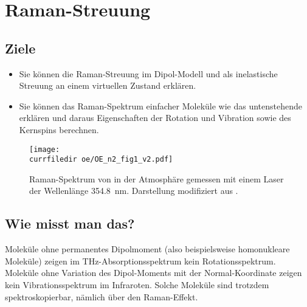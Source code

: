 
\chapter{Raman-Streuung}



% 


\section{Ziele}

\begin{itemize}
\item Sie können die Raman-Streuung im Dipol-Modell und als inelastische Streuung an einem virtuellen Zustand erklären.

\item Sie können das Raman-Spektrum einfacher Moleküle wie das untenstehende erklären und daraus Eigenschaften der Rotation und Vibration sowie des Kernspins berechnen.

\end{itemize}

\begin{figure}
\texttt{[image: \\currfiledir oe/OE\_n2\_fig1\_v2.pdf]}
\caption{Raman-Spektrum von  in der Atmosphäre gemessen mit einem Laser der Wellenlänge 354.8~nm. Darstellung  modifiziert aus \cite{Liu14_OE_N2}. }
\end{figure}


\section{Wie misst man das?}

Moleküle ohne permanentes Dipolmoment (also beispielsweise homonukleare Moleküle) zeigen im THz-Absorptionsspektrum kein Rotationsspektrum. Moleküle ohne  Variation des Dipol-Moments mit der Normal-Koordinate zeigen kein Vibrationsspektrum im Infraroten. Solche
Moleküle sind trotzdem spektroskopierbar, nämlich über den Raman-Effekt.

